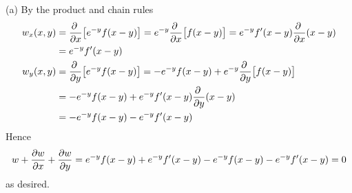 \begin{solution}
(a) By the product and chain rules
\begin{align*}
w_x(x,y) 
   &= \pdiff{}{x}\big[e^{-y}f(x-y)\big]
    = e^{-y} \pdiff{}{x}\big[f(x-y)\big]
    = e^{-y} f'(x-y)\pdiff{}{x}(x-y) \\
   &= e^{-y}f'(x-y) 
\\%
w_y(x,y) &= \pdiff{}{y}\big[e^{-y}f(x-y)\big]
    = -e^{-y}f(x-y) + e^{-y} \pdiff{}{y}\big[f(x-y)\big] \\
   &= -e^{-y}f(x-y) + e^{-y} f'(x-y)\pdiff{}{y}(x-y) \\
   &= -e^{-y}f(x-y)-e^{-y}f'(x-y)
\end{align*}
Hence
\begin{equation*}
w+\pdiff{w}{x}+\pdiff{w}{y}
=e^{-y}f(x-y)+e^{-y}f'(x-y)-e^{-y}f(x-y)-e^{-y}f'(x-y)
=0
\end{equation*}
as desired.


\end{solution}
